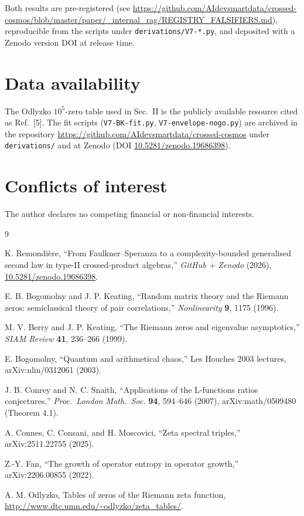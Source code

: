 \documentclass[aps,prd,superscriptaddress,nofootinbib,floatfix,10pt]{revtex4-2}
\begin{document}
Both results are pre-registered
(see \url{https://github.com/AIdevsmartdata/crossed-cosmos/blob/master/paper/_internal_rag/REGISTRY_FALSIFIERS.md}),
reproducible from the scripts under \texttt{derivations/V7-*.py}, and
deposited with a Zenodo version DOI at release time.

\section*{Data availability}
The Odlyzko $10^{5}$-zero table used in Sec.~II is the publicly
available resource cited as Ref.~[5]. The fit scripts
(\texttt{V7-BK-fit.py}, \texttt{V7-envelope-nogo.py}) are archived in
the repository \url{https://github.com/AIdevsmartdata/crossed-cosmos}
under \texttt{derivations/} and at Zenodo
(DOI \href{https://doi.org/10.5281/zenodo.19686398}{10.5281/zenodo.19686398}).

\section*{Conflicts of interest}
The author declares no competing financial or non-financial interests.


\begin{thebibliography}{9}

K. Remondi\`ere,
``From Faulkner--Speranza to a complexity-bounded generalised second
law in type-II crossed-product algebras,''
\textit{GitHub + Zenodo} (2026),
\href{https://doi.org/10.5281/zenodo.19686398}{10.5281/zenodo.19686398}.

E. B. Bogomolny and J. P. Keating,
``Random matrix theory and the Riemann zeros: semiclassical theory of
pair correlations,''
\textit{Nonlinearity} {\bf 9}, 1175 (1996).

M. V. Berry and J. P. Keating,
``The Riemann zeros and eigenvalue asymptotics,''
\textit{SIAM Review} {\bf 41}, 236--266 (1999).

E. Bogomolny,
``Quantum and arithmetical chaos,''
Les Houches 2003 lectures, arXiv:nlin/0312061 (2003).

J. B. Conrey and N. C. Snaith,
``Applications of the L-functions ratios conjectures,''
\textit{Proc.\ London Math.\ Soc.} {\bf 94}, 594--646 (2007),
arXiv:math/0509480 (Theorem 4.1).

A. Connes, C. Consani, and H. Moscovici,
``Zeta spectral triples,''
arXiv:2511.22755 (2025).

Z.-Y. Fan,
``The growth of operator entropy in operator growth,''
arXiv:2206.00855 (2022).

A. M. Odlyzko,
Tables of zeros of the Riemann zeta function,
\url{http://www.dtc.umn.edu/~odlyzko/zeta_tables/}.

\end{thebibliography}
\end{document}
